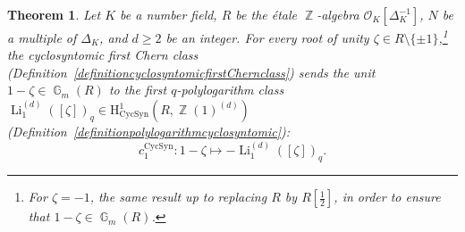 \documentclass[10pt,twoside]{scrarticle}
\newtheorem{theorem}{Theorem}[section]
\theoremstyle{definition}
\DeclareMathOperator{\Z}{\mathbb{Z}}
\newcommand{\Li}{\operatorname{Li}}
\DeclareMathOperator{\G}{\mathbb{G}}
\newcommand{\CycSyn}{\mathrm{CycSyn}}
\renewcommand{\ge}{\geqslant}
\numberwithin{equation}{theorem}
\begin{document}
\begin{theorem}\label{theoremmainLi1cyclosyntomic}
    Let $K$ be a number field, $R$ be the étale $\Z$-algebra $\mathcal{O}_K[\Delta_K^{-1}]$, $N$ be a multiple of $\Delta_K$, and $d \ge 2$ be an integer. For every root of unity $\zeta \in R\setminus\{\pm 1\}$,\footnote{For $\zeta = -1$, the same result up to replacing $R$ by $R[\tfrac{1}{2}]$, in order to ensure that $1-\zeta \in \G_m(R)$.} the cyclosyntomic first Chern class (Definition~\ref{definitioncyclosyntomicfirstChernclass}) sends the unit $1-\zeta \in \G_m(R)$ to the first $q$-polylogarithm class $\Li_1^{(d)}([\zeta])_q \in \mathrm{H}^1_{\CycSyn}(R,\Z(1)^{(d)})$ (Definition~\ref{definitionpolylogarithmcyclosyntomic}):
    $$c_1^{\CycSyn} : 1-\zeta \longmapsto -\Li_1^{(d)}([\zeta])_q.$$
\end{theorem}
\end{document}
